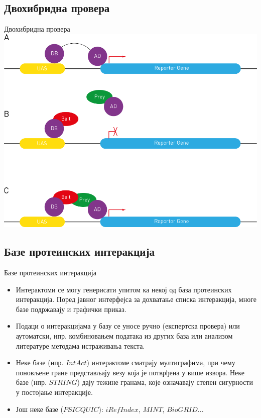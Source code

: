 \documentclass[hyperref={bookmarks=false}]{beamer}
\begin{document}
\subsection{Двохибридна провера}
\begin{frame}{Двохибридна провера}
\centering\includegraphics[width=.75\textwidth]{Y2H.png}
\end{frame}

\subsection{Базе протеинских интеракција}
\begin{frame}{Базе протеинских интеракција}
\begin{itemize}
	\item Интерактоми се могу генерисати упитом ка некој од база протеинских интеракција. Поред јавног интерфејса за дохватање списка интеракција, многе базе подржавају и графички приказ.

	\item Подаци о интеракцијама у базу се уносе ручно (експертска провера) или аутоматски, нпр. комбиновањем података из других база или анализом литературе методама истраживања текста.

	\item Неке базе (нпр. $IntAct$) интерактоме сматрају мултиграфима, при чему поновљене гране представљају везу која је потврђена у више извора. Неке базе (нпр. $STRING$) дају тежине гранама, које означавају степен сигурности у постојање интеракције.

	\item Још неке базе ($PSICQUIC$): $iRefIndex$, $MINT$, $BioGRID$...
\end{itemize}
\end{frame}
\end{document}
